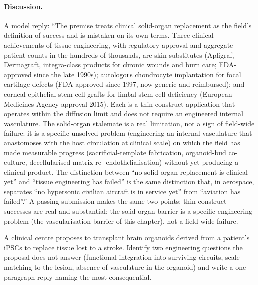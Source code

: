 \paragraph{Discussion.} A model reply: ``The premise treats clinical
solid-organ replacement as the field's definition of success and is
mistaken on its own terms. Three clinical achievements of tissue
engineering, with regulatory approval and aggregate patient counts
in the hundreds of thousands, are skin substitutes (Apligraf,
Dermagraft, integra-class products for chronic wounds and burn
care; FDA-approved since the late 1990s); autologous chondrocyte
implantation for focal cartilage defects (FDA-approved since 1997,
now generic and reimbursed); and corneal-epithelial-stem-cell
grafts for limbal stem-cell deficiency (European Medicines Agency
approval 2015). Each is a thin-construct application that operates
within the diffusion limit and does not require an engineered
internal vasculature. The solid-organ stalemate is a real
limitation, not a sign of field-wide failure: it is a specific
unsolved problem (engineering an internal vasculature that
anastomoses with the host circulation at clinical scale) on which
the field has made measurable progress (sacrificial-template
fabrication, organoid-bud co-culture, decellularised-matrix re-
endothelialisation) without yet producing a clinical product. The
distinction between ``no solid-organ replacement is clinical yet''
and ``tissue engineering has failed'' is the same distinction
that, in aerospace, separates ``no hypersonic civilian aircraft is
in service yet'' from ``aviation has failed''.'' A passing submission
makes the same two points: thin-construct successes are real and
substantial; the solid-organ barrier is a specific engineering
problem (the vascularisation barrier of this chapter), not a
field-wide failure.

\begin{exercise}
A clinical centre proposes to transplant brain organoids derived from
a patient's iPSCs to replace tissue lost to a stroke. Identify two
engineering questions the proposal does not answer (functional
integration into surviving circuits, scale matching to the lesion,
absence of vasculature in the organoid) and write a one-paragraph
reply naming the most consequential.
\end{exercise}

